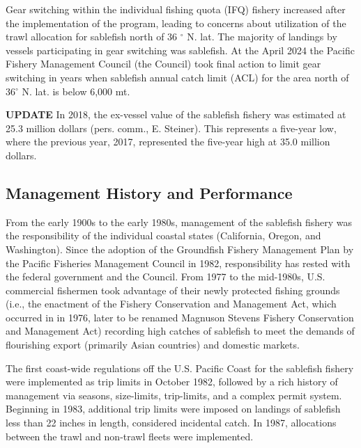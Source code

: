 \documentclass[
]{scrartcl}
\begin{document}
Gear switching within the individual fishing quota (IFQ) fishery
increased after the implementation of the program, leading to concerns
about utilization of the trawl allocation for sablefish north of 36
\(^{\circ}\) N. lat. The majority of landings by vessels participating
in gear switching was sablefish. At the April 2024 the Pacific Fishery
Management Council (the Council) took final action to limit gear
switching in years when sablefish annual catch limit (ACL) for the area
north of 36\(^{\circ}\) N. lat. is below 6,000 mt.

\textbf{UPDATE} In 2018, the ex-vessel value of the sablefish fishery
was estimated at 25.3 million dollars (pers. comm., E. Steiner). This
represents a five-year low, where the previous year, 2017, represented
the five-year high at 35.0 million dollars.

\subsection{Management History and
Performance}\label{management-history-and-performance}

From the early 1900s to the early 1980s, management of the sablefish
fishery was the responsibility of the individual coastal states
(California, Oregon, and Washington). Since the adoption of the
Groundfish Fishery Management Plan by the Pacific Fisheries Management
Council in 1982, responsibility has rested with the federal government
and the Council. From 1977 to the mid-1980s, U.S. commercial fishermen
took advantage of their newly protected fishing grounds (i.e., the
enactment of the Fishery Conservation and Management Act, which occurred
in in 1976, later to be renamed Magnuson Stevens Fishery Conservation
and Management Act) recording high catches of sablefish to meet the
demands of flourishing export (primarily Asian countries) and domestic
markets.

The first coast-wide regulations off the U.S. Pacific Coast for the
sablefish fishery were implemented as trip limits in October 1982,
followed by a rich history of management via seasons, size-limits,
trip-limits, and a complex permit system. Beginning in 1983, additional
trip limits were imposed on landings of sablefish less than 22 inches in
length, considered incidental catch. In 1987, allocations between the
trawl and non-trawl fleets were implemented.
\end{document}
